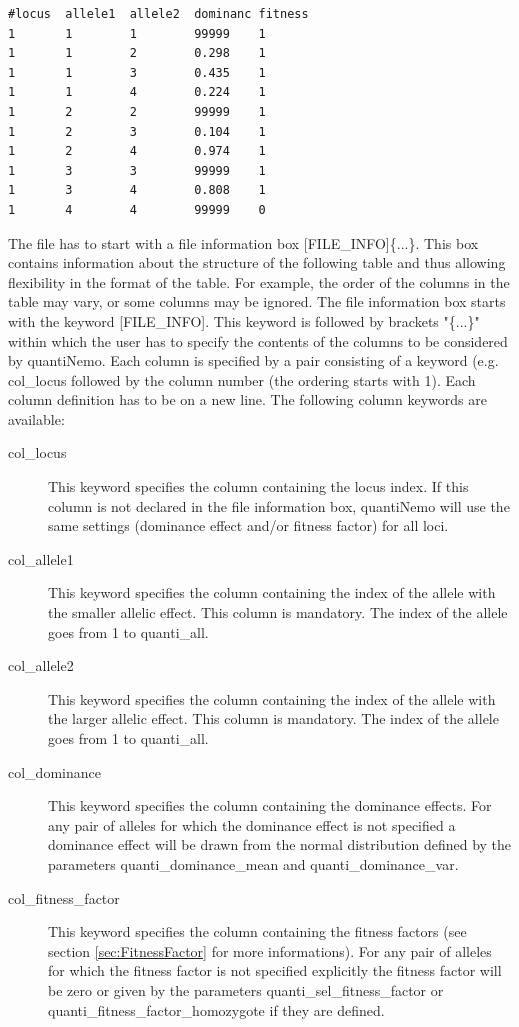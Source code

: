\documentclass[letterpaper,12pt,oneside]{book}
\begin{document}
\begin{description}
\begin{lstlisting}[frame=single]
#locus  allele1  allele2  dominanc fitness
1       1        1        99999    1
1       1        2        0.298    1
1       1        3        0.435    1
1       1        4        0.224    1
1       2        2        99999    1
1       2        3        0.104    1
1       2        4        0.974    1
1       3        3        99999    1
1       3        4        0.808    1
1       4        4        99999    0
\end{lstlisting}

The file has to start with a file information box \textsf{[FILE\_INFO]}\{...\}. 
This box contains information about the structure of the following table and thus allowing flexibility in the format of the table. For example, the order of the columns in the table may vary, or some columns may be ignored. The file information box starts with the keyword \textsf{[FILE\_INFO]}. This keyword is followed by brackets "\{...\}" within which the user has to specify the contents of the columns to be considered by quantiNemo. Each column is specified by a pair consisting of a keyword (e.g. \textsf{col\_locus} followed by the column number (the ordering starts with 1). Each column definition has to be on a new line. The following column keywords are available:
\begin{description}
\item [col\_locus] This keyword specifies the column containing the locus index. If this column is not declared in the file information box, quantiNemo will use the same settings (dominance effect and/or fitness factor) for all loci.
\item [col\_allele1] This keyword specifies the column containing the index of the allele with the smaller allelic effect. This column is mandatory. The index of the allele goes from 1 to \textsf{quanti\_all}.
\item [col\_allele2] This keyword specifies the column containing the index of the allele with the larger allelic effect. This column is mandatory. The index of the allele goes from 1 to \textsf{quanti\_all}.
\item [col\_dominance] This keyword specifies the column containing the dominance effects. For any pair of alleles for which the dominance effect is not specified a dominance effect will be drawn from the normal distribution defined by the parameters  \textsf{quanti\_dominance\_mean} and \textsf{quanti\_dominance\_var}.
\item [col\_fitness\_factor] This keyword specifies the column containing the fitness factors (see section \ref{sec:FitnessFactor} for more informations). For any pair of alleles for which the fitness factor is not specified explicitly the fitness factor will be zero or given by the parameters \textsf{quanti\_sel\_fitness\_factor} or \textsf{quanti\_fitness\_factor\_homozygote} if they are defined.

\end{description}
\end{description}
\end{document}
